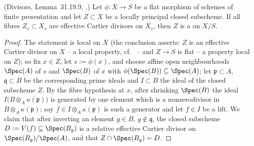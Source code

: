 \begin{lemma}
\label{lem:pc-recd-locally-principal}
(Divisors, Lemma~31.19.9,
.)  Let
$\phi:X\to S$ be a flat morphism of schemes of finite presentation and let
$Z\subset X$ be a locally principal closed subscheme.  If all fibres
$Z_s\subset X_s$ are effective Cartier divisors on $X_s$, then $Z$ is a
 on $X/S$.
\end{lemma}
\begin{proof}
The statement is local on $X$ (the conclusion asserts: $Z$ is an
effective Cartier divisor on $X$ -- a local property, cf.\
 -- and $Z\to S$ is flat -- a
property local on $Z$); so fix $x\in Z$, let $s:=\phi(x)$, and choose
affine open neighbourhoods $\Spec(A)$ of $s$ and $\Spec(B)$ of $x$
with $\phi(\Spec(B))\subseteq\Spec(A)$; let $\mathfrak
p\subset A$, $\mathfrak q\subset B$ be the corresponding prime
ideals and $I\subset B$ the ideal of the closed subscheme $Z$.
By the fibre hypothesis at $x$, after shrinking $\Spec(B)$ the ideal
$I\bigl(B\otimes_A\kappa(\mathfrak p)\bigr)$ is generated by one
element which is a nonzerodivisor in $B\otimes_A\kappa(\mathfrak p)$;
say $\bar f\in I\otimes_A\kappa(\mathfrak p)$ is such a generator and
let $f\in I$ be a lift.  We claim that after inverting an element
$g\in B$, $g\notin\mathfrak q$, the closed subscheme
$D:=V(f)\subseteq\Spec(B_g)$ is a relative effective Cartier divisor
on $\Spec(B_g)/\Spec(A)$, and that $Z\cap\Spec(B_g)=D$.


\end{proof}
